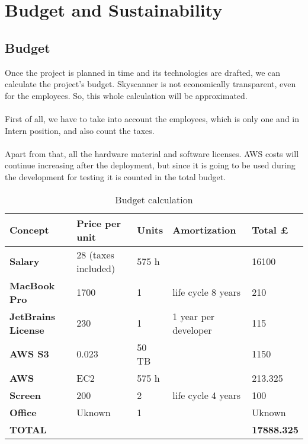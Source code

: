 
\chapter{Budget and Sustainability}

\label{chapter10}

\section{Budget}

Once the project is planned in time and its technologies are drafted, we can calculate the project’s budget. Skyscanner is not economically transparent, even for the employees. So, this whole calculation will be approximated.
\\\\
First of all, we have to take into account the employees, which is only one and in Intern position, and also count the taxes.
\\\\
Apart from that, all the hardware material and software licenses. AWS costs will continue increasing after the deployment, but since it is going to be used during the development for testing it is counted in the total budget.

\begin{table}[H]
\centering
\begin{tabular}{|l|l|l|l|l|}
\hline
\textbf{Concept}           & \textbf{Price per unit} & \textbf{Units} & \textbf{Amortization} & \textbf{Total £}   \\ \hline
\textbf{Salary}            & 28 (taxes included)     & 575 h          &                       & 16100              \\ \hline
\textbf{MacBook Pro}       & 1700                    & 1              & life cycle 8 years    & 210                \\ \hline
\textbf{JetBrains License} & 230                     & 1              & 1 year per developer  & 115                \\ \hline
\textbf{AWS S3}            & 0.023                   & 50 TB          &                       & 1150               \\ \hline
\textbf{AWS}               & EC2                     & 575 h          &                       & 213.325            \\ \hline
\textbf{Screen}            & 200                     & 2              & life cycle 4 years    & 100                \\ \hline
\textbf{Office}            & Uknown                  & 1              &                       & Uknown             \\ \hline
\textbf{TOTAL}             &                         &                &                       & \textbf{17888.325} \\ \hline
\end{tabular}
\caption{Budget calculation}
\label{budget-calculation}
\end{table}

